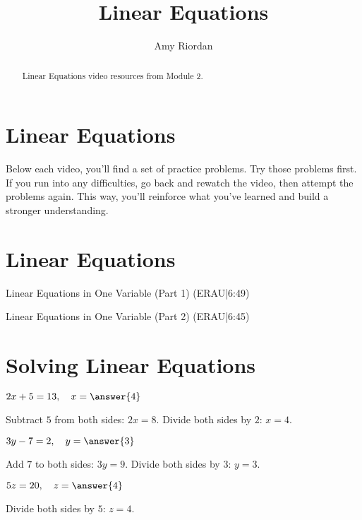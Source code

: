 \documentclass{ximera}
\title{Linear Equations}
\author{Amy Riordan}
\begin{document}
\begin{abstract}
Linear Equations video resources from Module 2.
\end{abstract}
\maketitle

\section*{Linear Equations}

Below each video, you’ll find a set of practice problems. Try those problems first. If you run into any difficulties, go back and rewatch the video, then attempt the problems again. This way, you’ll reinforce what you’ve learned and build a stronger understanding.

\section*{Linear Equations}

Linear Equations in One Variable (Part 1) (ERAU|6:49)


Linear Equations in One Variable (Part 2) (ERAU|6:45)



\section*{Solving Linear Equations}

\begin{problem}
$2x + 5 = 13,\quad x = \answer{4}$
\begin{feedback}
Subtract $5$ from both sides: $2x = 8$. Divide both sides by $2$: $x = 4$.
\end{feedback}
\end{problem}

\begin{problem}
$3y - 7 = 2,\quad y = \answer{3}$
\begin{feedback}
Add $7$ to both sides: $3y = 9$. Divide both sides by $3$: $y = 3$.
\end{feedback}
\end{problem}

\begin{problem}
$5z = 20,\quad z = \answer{4}$
\begin{feedback}
Divide both sides by $5$: $z = 4$.
\end{feedback}
\end{problem}
\end{document}
